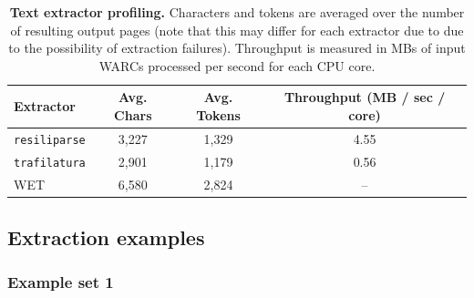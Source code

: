 \documentclass{article}
\newcommand{\trafilatura}{\texttt{trafilatura}\xspace}
\newcommand{\resiliparse}{\texttt{resiliparse}\xspace}
\begin{document}
\begin{table}[h]
\centering
\caption{\textbf{Text extractor profiling.} Characters and tokens are averaged over the number of resulting output pages (note that this may differ for each extractor due to due to the possibility of extraction failures). Throughput is measured in MBs of input WARCs processed per second for each CPU core. }
\label{tab:extractor_profiling}
\begin{tabular}{lccc}
\toprule
     Extractor & Avg. Chars &  Avg. Tokens & Throughput (MB / sec / core) \\
\midrule
    \resiliparse & 3,227 & 1,329 & 4.55  \\
    \trafilatura & 2,901 & 1,179 & 0.56 \\
    WET & 6,580 & 2,824 & -- \\
\midrule
\end{tabular}
\end{table}



\subsection{Extraction examples}\label{app:extraction_examples}

\subsubsection{Example set 1}
\end{document}
